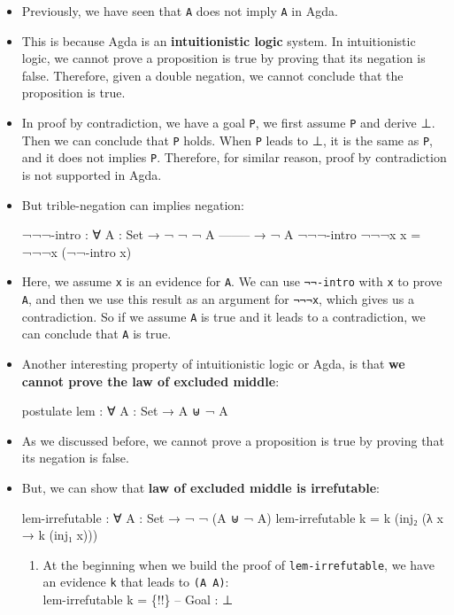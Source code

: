 \documentclass{lecturenotes}
\newcommand{\agdaempty}{\textsf{⊥}\xspace}
\begin{document}
\begin{itemize}
\item Previously, we have seen that \texttt{\lnot \lnot A} does not imply \texttt{A} in Agda.
\item This is because Agda is an \textbf{intuitionistic logic} system. 
      In intuitionistic logic, we cannot prove a proposition is true by proving that its negation is false.
      Therefore, given a double negation, we cannot conclude that the proposition is true.
\item In proof by contradiction, we have a goal \texttt{P}, we first assume \texttt{\lnot P} and derive \agdaempty.
      Then we can conclude that \texttt{P} holds. When \texttt{\lnot P} leads to \agdaempty, it is the same as 
      \texttt{\lnot \lnot P}, and it does not implies \texttt{P}. Therefore, for similar reason, proof by contradiction is not supported in Agda.

\item But trible-negation can implies negation:
\begin{code}
¬¬¬-intro : ∀ {A : Set}
    → ¬ ¬ ¬ A
    --------
    → ¬ A
¬¬¬-intro ¬¬¬x x = ¬¬¬x (¬¬-intro x)
\end{code}
\item Here, we assume \texttt{x} is an evidence for \texttt{A}. We can use \texttt{¬¬-intro} with \texttt{x} to prove \texttt{\lnot \lnot A},
      and then we use this result as an argument for \texttt{¬¬¬x}, which gives us a contradiction.
      So if we assume \texttt{A} is true and it leads to a contradiction, we can conclude that \texttt{\lnot A} is true.

\item Another interesting property of intuitionistic logic or Agda, is that
      \textbf{we cannot prove the law of excluded middle}:
\begin{code}
postulate
  lem : ∀ {A : Set} →  A ⊎ ¬ A
\end{code}
\item As we discussed before, we cannot prove a proposition is true by proving that its negation is false.

\item But, we can show that \textbf{law of excluded middle is irrefutable}:
\begin{code}
lem-irrefutable : ∀ {A : Set} → ¬ ¬ (A ⊎ ¬ A)
lem-irrefutable k = k (inj₂ (λ x → k (inj₁ x)))
\end{code}

\begin{enumerate}
\item At the beginning when we build the proof of \texttt{lem-irrefutable},
      we have an evidence \texttt{k} that leads to \texttt{\lnot (A \uplus \lnot A)}:
      \\ \textsf{lem-irrefutable k = \{!!\} -- Goal : \agdaempty}


\end{enumerate}
\end{itemize}
\end{document}
